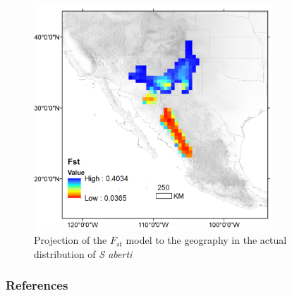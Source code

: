 \documentclass[
]{article}
\begin{document}
\begin{figure}
\centering
\includegraphics[width=0.8\textwidth,height=\textheight]{all_figures/figure_6.png}
\caption{Projection of the \(F_{st}\) model to the geography in the
actual distribution of \emph{S aberti}}
\end{figure}

\hypertarget{references}{%
\subsubsection*{References}\label{references}}
\end{document}
